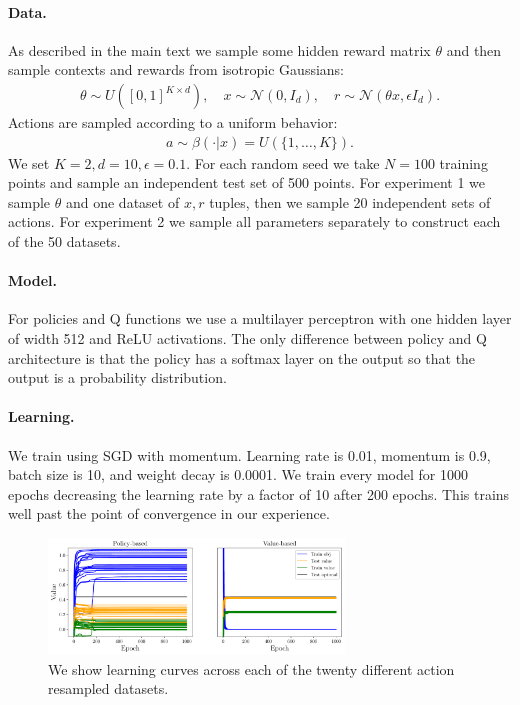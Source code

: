 \begin{subappendices}
\paragraph{Data.} As described in the main text we sample some hidden reward matrix $ \theta$ and then sample contexts and rewards from isotropic Gaussians:
\begin{align*}
    \theta \sim U([0,1]^{K\times d}),\quad x \sim \mathcal{N}(0, I_d), \quad r \sim \mathcal{N}(\theta x, \epsilon I_d).
\end{align*}
Actions are sampled according to a uniform behavior:
\begin{align*}
    a\sim \beta(\cdot|x) = U(\{1,\dots,K\}).
\end{align*}
We set $ K=2, d = 10, \epsilon = 0.1$. For each random seed we take $ N = 100$ training points and sample an independent test set of 500 points.
For experiment 1 we sample $ \theta$ and one dataset of $ x,r$ tuples, then we sample 20 independent sets of actions. For experiment 2 we sample all parameters separately to construct each of the 50 datasets.

\paragraph{Model.} For policies and Q functions we use a multilayer perceptron with one hidden layer of width 512 and ReLU activations. The only difference between policy and Q architecture is that the policy has a softmax layer on the output so that the output is a probability distribution.

\paragraph{Learning.} We train using SGD with momentum. Learning rate is 0.01, momentum is 0.9, batch size is 10, and weight decay is 0.0001. We train every model for 1000 epochs decreasing the learning rate by a factor of 10 after 200 epochs. This trains well past the point of convergence in our experience.

\begin{figure}[h]
    \centering
    \includegraphics[width=0.7\textwidth]{figures/offline-bandits/toy_learning.pdf}
    \caption{We show learning curves across each of the twenty different action resampled datasets.}
    \label{fig:toy_learning}
\end{figure}


\end{subappendices}
